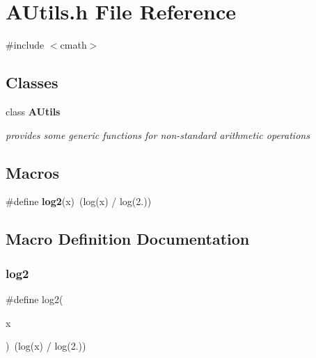 \section{A\+Utils.\+h File Reference}
\label{AUtils_8h}
{\ttfamily \#include $<$cmath$>$}\newline
\subsection*{Classes}
\begin{DoxyCompactItemize}
\item 
class \textbf{ A\+Utils}
\begin{DoxyCompactList}\small\item\em provides some generic functions for non-\/standard arithmetic operations \end{DoxyCompactList}\end{DoxyCompactItemize}
\subsection*{Macros}
\begin{DoxyCompactItemize}
\item 
\#define \textbf{ log2}(x)~(log(x) / log(2.))
\end{DoxyCompactItemize}


\subsection{Macro Definition Documentation}
\mbox{\label{AUtils_8h_a18af743c2cec4baeee9ffb27999ddaad}} 
\subsubsection{log2}
{\footnotesize\ttfamily \#define log2(\begin{DoxyParamCaption}\item[{}]{x }\end{DoxyParamCaption})~(log(x) / log(2.))}

